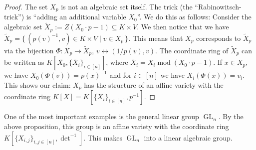 \begin{proof}
  The set $X_p$ is not an algebraic set itself.
  The trick (the ``Rabinowitsch-trick'') is ``adding an additional variable $X_0$''.
  We do this as follows:
  Consider the algebraic set $\tilde{X}_p := Z \left( X_0 \cdot p -1 \right) \subseteq K \times V$.
  We then notice that we have $\tilde{X}_p = \{\, (p(v)^{-1},v) \in K \times V \mid v \in X_p \,\}$.
  This means that $X_p$ corresponds to $\tilde{X}_p$ via the bijection $\Phi \colon X_p \rightarrow \tilde{X}_p$, $ v \leftrightarrow (1/p(v),v)$.
  The coordinate ring of $\tilde{X}_p$ can be written as $K[\bar{X_0}, \{\bar{X}_i\}_{i \in [n]}]$, where $\bar{X}_i = X_i \operatorname{mod} (X_0 \cdot p -1)$.
  If $x \in X_p$, we have $\bar{X}_0 (\Phi(v)) = p(x)^{-1}$ and for $ i \in [n] $ we have $\bar{X_i}(\Phi(x)) = v_i$.
  This shows our claim: $X_p$ has the structure of an affine variety with the coordinate ring $K[X] = K[\{X_i\}_{i \in [n]}, p^{-1}]$.
\end{proof}

\begin{dexample}
  One of the most important examples is the general linear group $\operatorname{GL}_n$.
  By the above proposition, this group is an affine variety with the coordinate ring $K[\{X_{i,j}\}_{i,j \in [n]}, \operatorname{det}^{-1}]$.
  This makes $\operatorname{GL}_n$ into a linear algebraic group.
\end{dexample}

